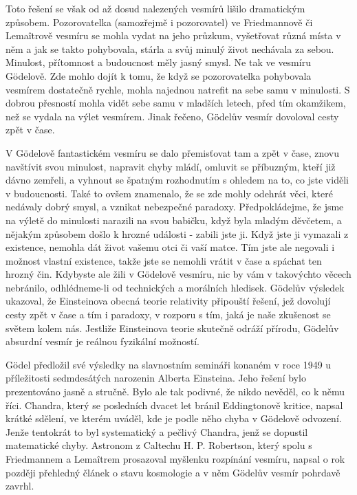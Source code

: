   Toto řešení se však od až dosud nalezených vesmírů lišilo dramatickým způsobem. Pozorovatelka
  (samozřejmě i pozorovatel) ve Friedmannově či Lemaîtrově vesmíru se mohla vydat na jeho průzkum,
  vyšetřovat různá místa v něm a jak se takto pohybovala, stárla a svůj minulý život nechávala za
  sebou. Minulost, přítomnost a budoucnost měly jasný smysl. Ne tak ve vesmíru Gödelově. Zde mohlo
  dojít k tomu, že když se pozorovatelka pohybovala vesmírem dostatečně rychle, mohla najednou
  natrefit na sebe samu v minulosti. S dobrou přesností mohla vidět sebe samu v mladších letech,
  před tím okamžikem, než se vydala na výlet vesmírem. Jinak řečeno, Gödelův vesmír dovoloval cesty
  zpět v čase. 
  
  V Gödelově fantastickém vesmíru se dalo přemisťovat tam a zpět v čase, znovu navštívit svou
  minulost, napravit chyby mládí, omluvit se příbuzným, kteří již dávno zemřeli, a vyhnout se
  špatným rozhodnutím s ohledem na to, co jste viděli v budoucnosti. Také to ovšem znamenalo, že se
  zde mohly odehrát věci, které nedávaly dobrý smysl, a vznikat nebezpečné paradoxy. Předpokládejme,
  že jsme na výletě do minulosti narazili na svou babičku, když byla mladým děvčetem, a nějakým
  způsobem došlo k hrozné události - zabili jste ji. Když jste ji vymazali z existence, nemohla dát
  život vašemu otci či vaší matce. Tím jste ale negovali i možnost vlastní existence, takže jste se
  nemohli vrátit v čase a spáchat ten hrozný čin. Kdybyste ale žili v Gödelově vesmíru, nic by vám v
  takovýchto věcech nebránilo, odhlédneme-li od technických a morálních hledisek. Gödelův výsledek
  ukazoval, že Einsteinova obecná teorie relativity připouští řešení, jež dovolují cesty zpět v čase
  a tím i paradoxy, v rozporu s tím, jaká je naše zkušenost se světem kolem nás. Jestliže
  Einsteinova teorie skutečně odráží přírodu, Gödelův absurdní vesmír je reálnou fyzikální možností.
  
  Gödel předložil své výsledky na slavnostním semináři konaném v roce 1949 u příležitosti
  sedmdesátých narozenin Alberta Einsteina. Jeho řešení bylo prezentováno jasně a stručně. Bylo ale
  tak podivné, že nikdo nevěděl, co k němu říci. Chandra, který se posledních dvacet let bránil
  Eddingtonově kritice, napsal krátké sdělení, ve kterém uváděl, kde je podle něho chyba v Gödelově
  odvození. Jenže tentokrát to byl systematický a pečlivý Chandra, jenž se dopustil matematické
  chyby. Astronom z Caltechu H. P. Robertson, který spolu s Friedmannem a Lemaîtrem prosazoval
  myšlenku rozpínání vesmíru, napsal o rok později přehledný článek o stavu kosmologie a v něm
  Gödelův vesmír pohrdavě zavrhl. 
  
